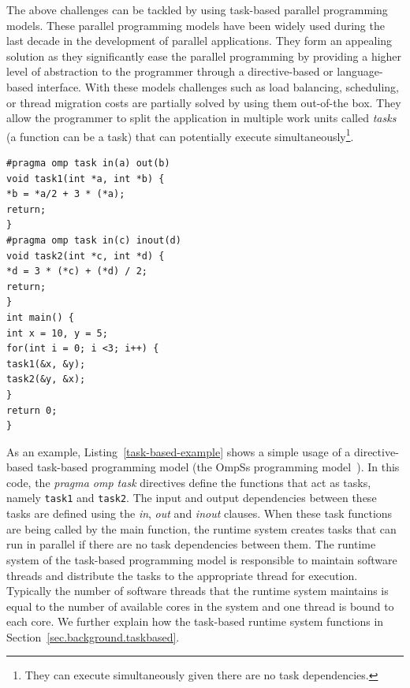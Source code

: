 The above challenges can be tackled by using task-based parallel programming models.
These parallel programming models have been widely used during the last decade in the development of parallel applications.
They form an appealing solution as they significantly ease the parallel programming by providing a higher level of abstraction to the programmer through a directive-based or language-based interface.
With these models challenges such as load balancing, scheduling, or thread migration costs are partially solved by using them out-of-the box.
They allow the programmer to split the application in multiple work units called \textit{tasks} (a function can be a task) that can potentially execute simultaneously\footnote{They can execute simultaneously given there are no task dependencies.}.
\begin{lstlisting}[float, emph={void,if,return}, captionpos=b, caption={Example code using the OmpSs task-based programming model.},label=task-based-example, emph={[2]mat}, emphstyle={[3]}, aboveskip={0\baselineskip}, frame=tb, belowskip={0\baselineskip}]
#pragma omp task in(a) out(b)
void task1(int *a, int *b) {
*b = *a/2 + 3 * (*a);
return;
}
#pragma omp task in(c) inout(d)
void task2(int *c, int *d) {
*d = 3 * (*c) + (*d) / 2;
return;
}
int main() { 
int x = 10, y = 5;
for(int i = 0; i <3; i++) {
task1(&x, &y);
task2(&y, &x);
}
return 0;
}
\end{lstlisting}
As an example, Listing~\ref{task-based-example} shows a simple usage of a directive-based task-based programming model (the OmpSs programming model~\cite{OmpSs}).
In this code, the \textit{pragma omp task} directives define the functions that act as tasks, namely \texttt{task1} and \texttt{task2}.
The input and output dependencies between these tasks are defined using the \textit{in}, \textit{out} and \textit{inout} clauses.
When these task functions are being called by the main function, the runtime system creates tasks that can run in parallel if there are no task dependencies between them.
The runtime system of the task-based programming model is responsible to maintain software threads and distribute the tasks to the appropriate thread for execution.
Typically the number of software threads that the runtime system maintains is equal to the number of available cores in the system and one thread is bound to each core.
We further explain how the task-based runtime system functions in Section~\ref{sec.background.taskbased}.


